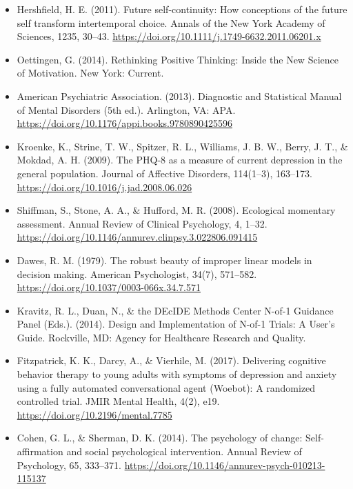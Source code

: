 \documentclass[10pt]{article}
\theoremstyle{remark}
\begin{document}
\begin{itemize}[leftmargin=1em,itemsep=0pt,topsep=1pt,parsep=0pt]
\item Hershfield, H. E. (2011). Future self-continuity: How conceptions of the future self transform intertemporal choice. Annals of the New York Academy of Sciences, 1235, 30--43. \url{https://doi.org/10.1111/j.1749-6632.2011.06201.x}
\item Oettingen, G. (2014). Rethinking Positive Thinking: Inside the New Science of Motivation. New York: Current.
\item American Psychiatric Association. (2013). Diagnostic and Statistical Manual of Mental Disorders (5th ed.). Arlington, VA: APA. \url{https://doi.org/10.1176/appi.books.9780890425596}
\item Kroenke, K., Strine, T. W., Spitzer, R. L., Williams, J. B. W., Berry, J. T., \& Mokdad, A. H. (2009). The PHQ-8 as a measure of current depression in the general population. Journal of Affective Disorders, 114(1--3), 163--173. \url{https://doi.org/10.1016/j.jad.2008.06.026}
\item Shiffman, S., Stone, A. A., \& Hufford, M. R. (2008). Ecological momentary assessment. Annual Review of Clinical Psychology, 4, 1--32. \url{https://doi.org/10.1146/annurev.clinpsy.3.022806.091415}
\item Dawes, R. M. (1979). The robust beauty of improper linear models in decision making. American Psychologist, 34(7), 571--582. \url{https://doi.org/10.1037/0003-066x.34.7.571}
\item Kravitz, R. L., Duan, N., \& the DEcIDE Methods Center N-of-1 Guidance Panel (Eds.). (2014). Design and Implementation of N-of-1 Trials: A User's Guide. Rockville, MD: Agency for Healthcare Research and Quality.
\item Fitzpatrick, K. K., Darcy, A., \& Vierhile, M. (2017). Delivering cognitive behavior therapy to young adults with symptoms of depression and anxiety using a fully automated conversational agent (Woebot): A randomized controlled trial. JMIR Mental Health, 4(2), e19. \url{https://doi.org/10.2196/mental.7785}
\item Cohen, G. L., \& Sherman, D. K. (2014). The psychology of change: Self-affirmation and social psychological intervention. Annual Review of Psychology, 65, 333--371. \url{https://doi.org/10.1146/annurev-psych-010213-115137}
\end{itemize}
\end{document}
